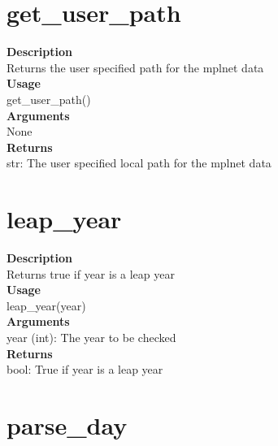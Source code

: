 \documentclass[11pt, oneside]{article}
\begin{document}

\section{get\_user\_path}

\textbf{Description} \\
        Returns the user specified path for the mplnet data\\

\noindent\textbf{Usage} \\
        get\_user\_path() \\

\noindent\textbf{Arguments} \\
        None\\

\noindent\textbf{Returns} \\
        str: The user specified local path for the mplnet data\\


\section{leap\_year}

\textbf{Description} \\
        Returns true if year is a leap year\\

\noindent\textbf{Usage} \\
        leap\_year(year) \\

\noindent\textbf{Arguments} \\
        year (int): The year to be checked\\

\noindent\textbf{Returns} \\
        bool: True if year is a leap year\\


\section{parse\_day}
\end{document}
